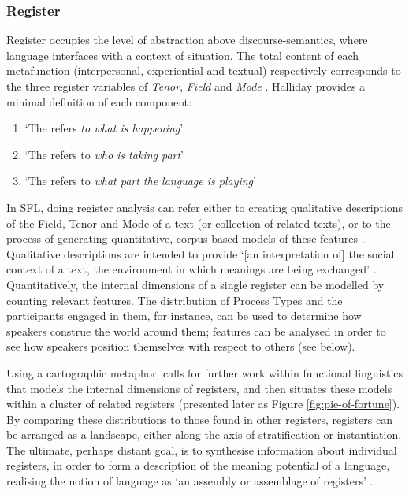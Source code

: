 \subsubsection{Register}

Register occupies the level of abstraction above \glspl{discourse-semantic}, where language interfaces with a context of situation. The total content of each metafunction (interpersonal, experiential and textual) respectively corresponds to the three register variables of \emph{Tenor}, \emph{Field} and \emph{Mode} \cite{halliday_language_1989}. Halliday provides a minimal definition of each component:

\begin{enumerate}
\item  `The  refers \emph{to what is happening}'
\item `The  refers to \emph{who is taking part}'
\item `The  refers to \emph{what part the language is playing}' \cite[p.~12]{halliday_language_1989}
\end{enumerate}
%
In \gls{SFL}, doing register analysis can refer either to creating qualitative descriptions of the Field, Tenor and \gls{Mode} of a text (or collection of related texts), or to the process of generating quantitative, corpus\hyp{}based models of these features \cite{lukin2011halliday,matthiessen_modeling_2015}. Qualitative descriptions are intended to provide `[an interpretation of] the social context of a text, the environment in which meanings are being exchanged' \cite[p.~12]{halliday_language_1989}. Quantitatively, the internal dimensions of a single register can be modelled by counting relevant  features. The distribution of Process Types and the participants engaged in them, for instance, can be used to determine how speakers construe the world around them;  features can be analysed in order to see how speakers position themselves with respect to others (see below). 

Using a cartographic metaphor, \textcite{matthiessen_modeling_2015,Matthiessen2015} calls for further work within functional linguistics that models the internal dimensions of registers, and then situates these models within a cluster of related registers (presented later as Figure \ref{fig:pie-of-fortune}). By comparing these distributions to those found in other registers, registers can be arranged as a landscape, either along the axis of stratification or instantiation. The ultimate, perhaps distant goal, is to synthesise information about individual registers, in order to form a description of the meaning potential of a language, realising the notion of language as `an assembly or assemblage of registers' \parencite*[p.~44]{matthiessen_modeling_2015}. 

